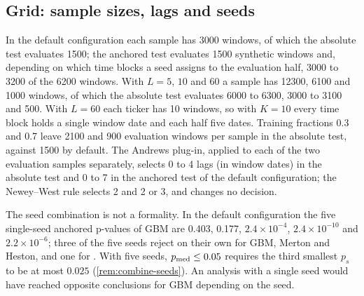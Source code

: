 \subsection{Grid: sample sizes, lags and seeds}

In the default configuration each sample has 3000 \TEST{} windows, of which the absolute test
evaluates 1500; the anchored test evaluates 1500 synthetic windows and, depending on which time
blocks a seed assigns to the evaluation half, 3000 to 3200 of the 6200 \TRAIN{} windows. With
$L=5$, $10$ and $60$ a sample has 12300, 6100 and 1000 \TEST{} windows, of which the absolute test
evaluates 6000 to 6300, 3000 to 3100 and 500. With $L=60$ each ticker has 10 \TEST{} windows, so
with $K=10$ every time block holds a single window date and each half five dates. Training
fractions 0.3 and 0.7 leave 2100 and 900 evaluation windows per sample in the absolute test,
against 1500 by default. The Andrews plug-in, applied to each of the two evaluation samples
separately, selects 0 to 4 lags (in window dates) in the absolute test and 0 to 7 in the
anchored test of the default configuration; the Newey--West rule selects 2 and 2 or 3, and
changes no decision.

The seed combination is not a formality. In the default configuration the five single-seed
anchored p-values of GBM are 0.403, 0.177, $2.4\times10^{-4}$, $2.4\times10^{-10}$ and
$2.2\times10^{-6}$; three of the five seeds reject on their own for GBM, Merton and Heston, and one
for \GARCHt. With five seeds, $p_{\mathrm{med}}\le0.05$ requires the third smallest $p_s$ to be at most
$0.025$ (\cref{rem:combine-seeds}). An analysis with a single seed would have reached opposite
conclusions for GBM depending on the seed.

\begin{table}[tbp]
  \centering
  \caption{E5 grid, all p-values: anchored relative and absolute \WC{} tests per configuration
    and generator (100 tickers, \TEST{} 2023-01-03 to 2025-06-16, five synthetic seeds,
    $\alpha=0.05$). Condensed version: \cref{tab:manual-e5-sensitivity}.}
  \label{tab:e5-sensitivity}
  \small\setlength{\tabcolsep}{3pt}
\end{table}

